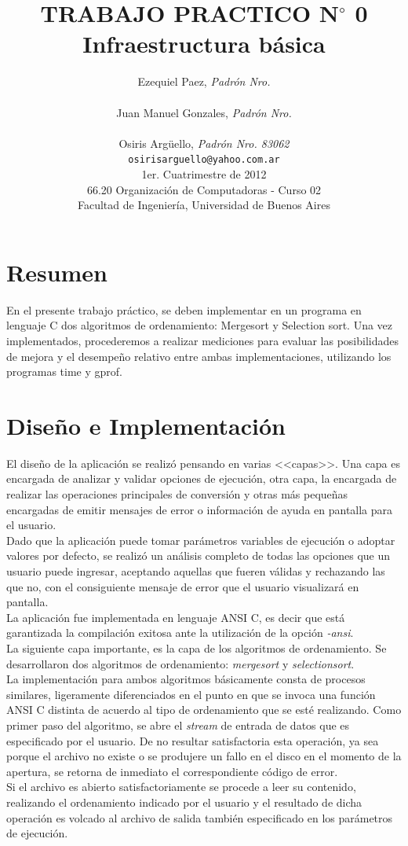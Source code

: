 \documentclass[a4paper,10pt]{article}
\title{		\textbf{TRABAJO PRACTICO N$^{\circ}$ 0}\\ \textbf{Infraestructura básica}}
\author{	
	    Ezequiel Paez, \textit{Padrón Nro. }                     \\
            \texttt{  }                                            \\[2.5ex]
            Juan Manuel Gonzales, \textit{Padrón Nro. }                     \\
            \texttt{  }                                              \\[2.5ex]
            Osiris Argüello, \textit{Padrón Nro. 83062}                     \\
            \texttt{ osirisarguello@yahoo.com.ar }                                              \\[2.5ex]
            \normalsize{1er. Cuatrimestre de 2012}                                      \\
            \normalsize{66.20 Organización de Computadoras - Curso 02}  \\
            \normalsize{Facultad de Ingeniería, Universidad de Buenos Aires}            \\
       }
\date{}
\begin{document}
\maketitle
\thispagestyle{empty}   
\newpage
\setcounter{page}{5} 
\tableofcontents
\newpage

\section{Resumen}
En el presente trabajo práctico, se deben implementar en un programa en lenguaje C dos algoritmos de ordenamiento: Mergesort y Selection sort.
Una vez implementados, procederemos a realizar mediciones para evaluar las posibilidades de mejora y el desempeño relativo entre ambas implementaciones, utilizando los programas time y gprof.


\section{Diseño e Implementación}
El diseño de la aplicación se realizó pensando en varias <<capas>>. Una capa es encargada de analizar y validar opciones de ejecución, otra capa, la encargada de realizar las operaciones principales de conversión y otras más pequeñas encargadas de emitir mensajes de error o información de ayuda en pantalla para el usuario.\\

Dado que la aplicación puede tomar parámetros variables de ejecución o adoptar valores por defecto, se realizó un análisis completo de todas las opciones que un usuario puede ingresar, aceptando aquellas que fueren válidas y rechazando las que no, con el consiguiente mensaje de error que el usuario visualizará en pantalla.\\

La aplicación fue implementada en lenguaje ANSI C, es decir que está garantizada la compilación exitosa ante la utilización de la opción \textit{-ansi}.\\

La siguiente capa importante, es la capa de los algoritmos de ordenamiento. Se desarrollaron dos algoritmos de ordenamiento: \textit{mergesort} y \textit{selectionsort}. \\

La implementación para ambos algoritmos básicamente consta de procesos similares, ligeramente diferenciados en el punto en que se invoca una función ANSI C distinta de acuerdo al tipo de ordenamiento que se esté realizando. Como primer paso del algoritmo, se abre el \textit{stream} de entrada de datos que es especificado por el usuario. De no resultar satisfactoria esta operación, ya sea porque el archivo no existe o se produjere un fallo en el disco en el momento de la apertura, se retorna de inmediato el correspondiente código de error.\\
Si el archivo es abierto satisfactoriamente se procede a leer su contenido, realizando el ordenamiento indicado por el usuario y el resultado de dicha operación es volcado al archivo de salida también especificado en los parámetros de ejecución.\\
\end{document}
